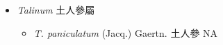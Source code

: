 
  \begin{itemize}
 \item[] \textit{Talinum} 土人參屬
                                
  \begin{itemize}
        \item[] \textit{T. paniculatum} (Jacq.) Gaertn.  土人參   NA
  \end{itemize}
  \end{itemize}
